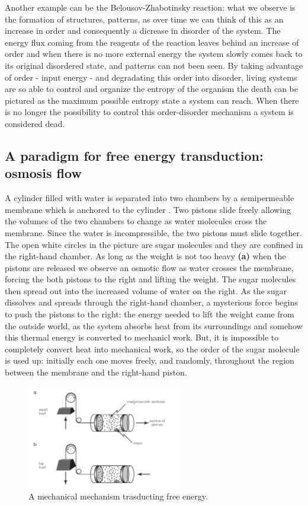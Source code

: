 \documentclass[../main/main.tex]{subfiles}
\begin{document}
Another example can be the Belousov-Zhabotinsky reaction: what we observe is the formation of structures, patterns, as over time we can think of this as an increase in order and consequently a dicrease in disorder of the system. The energy flux coming from the reagents of the reaction leaves behind an increase of order and when there is no more external energy the system slowly comes back to its original disordered state, and patterns can not been seen. 
By taking advantage of order - input energy - and degradating this order into disorder, living systems are so able to control and organize the entropy of the organism the death can be pictured as the maximum possible entropy state a system can reach. When there is no longer the possibility to control this order-disorder mechanism a system is considered dead.

\subsection{A paradigm for free energy transduction: osmosis flow}
A cylinder filled with water is separated into two chambers by a semipermeable membrane which is anchored to the cylinder \cite{biological_physics}. Two pistons slide freely allowing the volumes of the two chambers to change as water molecules cross the membrane. Since the water is incompressible, the two pistons must slide together. The open white circles in the picture are sugar molecules and they are confined in the right-hand chamber. 
As long as the weight is not too heavy \textbf{(a)} when the pistons are released we observe an osmotic flow as water crosses the membrane, forcing the both pistons to the right and lifting the weight. The sugar molecules then spread out into the increased volume of water on the right. 
As the sugar dissolves and spreads through the right-hand chamber, a mysterious force begins to push the pistons to the right: the energy needed to lift the weight came from the outside world, as the system absorbs heat from its surroundings and somehow this thermal energy is converted to mechanicl work. But, it is impossible to completely convert heat into mechanical work, so the order of the sugar molecule is used up: initially each one moves freely, and randomly, throughout the region
between the membrane and the right-hand piston. 

\begin{figure}[h!]
    \centering
    \includegraphics[width=0.6\textwidth]{../frontespizio/tikz/1_lesson/osmosis.PNG}
    \caption{A mechanical mechanism trasducting free energy.}
\end{figure}
\end{document}
